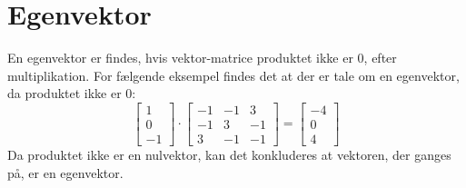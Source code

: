 \section{Egenvektor}
En egenvektor er findes, hvis vektor-matrice produktet ikke er 0, efter multiplikation.
For fælgende eksempel findes det at der er tale om en egenvektor, da produktet ikke er 0:
\begin{equation}
    \left[
        \begin{matrix}
            1\\
            0\\
            -1
        \end{matrix}
    \right]
    \cdot
    \left[
        \begin{matrix}
            -1&-1&3\\
            -1&3&-1\\
            3&-1&-1
        \end{matrix}
    \right]
    =
    \left[
        \begin{matrix}
            -4\\
            0\\
            4
        \end{matrix}
    \right]
\end{equation}
Da produktet ikke er en nulvektor, kan det konkluderes at vektoren, der ganges på, er en egenvektor.
